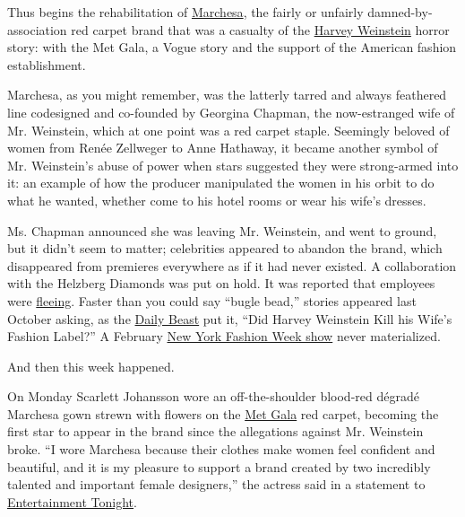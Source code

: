 Thus begins the rehabilitation of
\href{https://www.nytimes3xbfgragh.onion/2017/10/13/style/harvey-weinstein-marchesa-georgina-chapman-anna-wintour.html}{Marchesa},
the fairly or unfairly damned-by-association red carpet brand that was a
casualty of the
\href{https://www.nytimes3xbfgragh.onion/topic/person/harvey-weinstein}{Harvey
Weinstein} horror story: with the Met Gala, a Vogue story and the
support of the American fashion establishment.

Marchesa, as you might remember, was the latterly tarred and always
feathered line codesigned and co-founded by Georgina Chapman, the
now-estranged wife of Mr. Weinstein, which at one point was a red carpet
staple. Seemingly beloved of women from Renée Zellweger to Anne
Hathaway, it became another symbol of Mr. Weinstein's abuse of power
when stars suggested they were strong-armed into it: an example of how
the producer manipulated the women in his orbit to do what he wanted,
whether come to his hotel rooms or wear his wife's dresses.

Ms. Chapman announced she was leaving Mr. Weinstein, and went to ground,
but it didn't seem to matter; celebrities appeared to abandon the brand,
which disappeared from premieres everywhere as if it had never existed.
A collaboration with the Helzberg Diamonds was put on hold. It was
reported that employees were
\href{https://www.vanityfair.com/style/2017/10/georgina-chapman-marchesa-employees-leaving-report}{fleeing}.
Faster than you could say ``bugle bead,'' stories appeared last October
asking, as the
\href{https://www.thedailybeast.com/has-harvey-weinstein-killed-marchesas-red-carpet-future}{Daily
Beast} put it, ``Did Harvey Weinstein Kill his Wife's Fashion Label?'' A
February
\href{https://www.nytimes3xbfgragh.onion/2018/02/08/fashion/fashion-week-ready-to-wear-fall-2018-me-too-marchesa-rihanna.html}{New
York Fashion Week show} never materialized.

And then this week happened.

On Monday Scarlett Johansson wore an off-the-shoulder blood-red dégradé
Marchesa gown strewn with flowers on the
\href{https://www.nytimes3xbfgragh.onion/2018/05/07/fashion/met-gala-red-carpet.html}{Met
Gala} red carpet, becoming the first star to appear in the brand since
the allegations against Mr. Weinstein broke. ``I wore Marchesa because
their clothes make women feel confident and beautiful, and it is my
pleasure to support a brand created by two incredibly talented and
important female designers,'' the actress said in a statement to
\href{https://www.etonline.com/scarlett-johansson-explains-why-she-wore-marchesa-to-met-gala-101872}{Entertainment
Tonight}.

